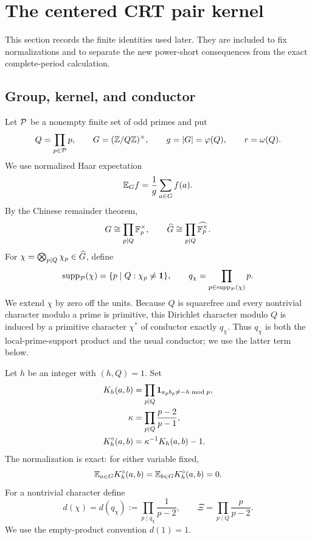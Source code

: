 \section{The centered CRT pair kernel}\label{sec:kernel-framework}

This section records the finite identities used later.  They are included to fix normalizations and to separate the new power-short consequences from the exact complete-period calculation.

\subsection{Group, kernel, and conductor}

Let $\mathcal P$ be a nonempty finite set of odd primes and put
\begin{equation}\label{eq:Q-G-definitions}
 Q=\prod_{p\in\mathcal P}p,
 \qquad
 G=(\mathbb Z/Q\mathbb Z)^\times,
 \qquad
 g=|G|=\varphi(Q),
 \qquad
 r=\omega(Q).
\end{equation}
We use normalized Haar expectation
\[
 \mathbb E_G f=\frac1g\sum_{a\in G}f(a).
\]
By the Chinese remainder theorem,
\[
 G\cong\prod_{p\mid Q}\mathbb F_p^\times,
 \qquad
 \widehat G\cong\prod_{p\mid Q}\widehat{\mathbb F_p^\times}.
\]
For $\chi=\bigotimes_{p\mid Q}\chi_p\in\widehat G$, define
\begin{equation}\label{eq:local-prime-support-conductor}
 \operatorname{supp}_{\mathcal P}(\chi)=\{p\mid Q:\chi_p\ne\mathbf 1\},
 \qquad
 q_\chi=\prod_{p\in\operatorname{supp}_{\mathcal P}(\chi)}p.
\end{equation}
We extend $\chi$ by zero off the units.  Because $Q$ is squarefree and every nontrivial character modulo a prime is primitive, this Dirichlet character modulo $Q$ is induced by a primitive character $\chi^*$ of conductor exactly $q_\chi$.  Thus $q_\chi$ is both the local-prime-support product and the usual conductor; we use the latter term below.

Let $h$ be an integer with $(h,Q)=1$.  Set
\begin{align}
 K_h(a,b)
  &=\prod_{p\mid Q}\mathbf 1_{a_pb_p\ne-h\bmod p},\label{eq:local-binary-kernel}\\
 \kappa
  &=\prod_{p\mid Q}\frac{p-2}{p-1},\label{eq:kappa-definition}\\
 K_h^\circ(a,b)
  &=\kappa^{-1}K_h(a,b)-1.\label{eq:centered-kernel-definition}
\end{align}
The normalization is exact: for either variable fixed,
\begin{equation}\label{eq:exact-row-column-centering}
 \mathbb E_{a\in G}K_h^\circ(a,b)
 =\mathbb E_{b\in G}K_h^\circ(a,b)=0.
\end{equation}
For a nontrivial character define
\begin{equation}\label{eq:dchi-definition}
 d(\chi)=d(q_\chi)
 :=\prod_{p\mid q_\chi}\frac1{p-2},
 \qquad
 \Xi=\prod_{p\mid Q}\frac p{p-2}.
\end{equation}
We use the empty-product convention $d(1)=1$.


